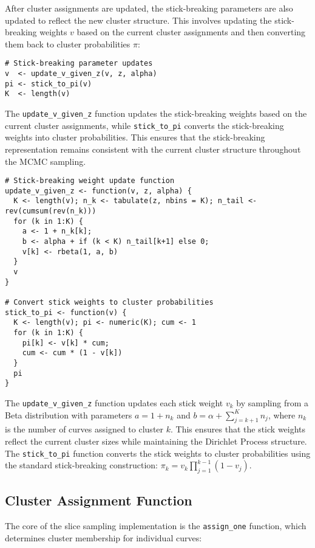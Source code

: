 \documentclass[11pt]{article}
\begin{document}
After cluster assignments are updated, the stick-breaking parameters are also updated to reflect the new cluster structure. This involves updating the stick-breaking weights $v$ based on the current cluster assignments and then converting them back to cluster probabilities $\pi$:

\begin{lstlisting}
# Stick-breaking parameter updates
v  <- update_v_given_z(v, z, alpha)
pi <- stick_to_pi(v)
K  <- length(v)
\end{lstlisting}

The \texttt{update\_v\_given\_z} function updates the stick-breaking weights based on the current cluster assignments, while \texttt{stick\_to\_pi} converts the stick-breaking weights into cluster probabilities. This ensures that the stick-breaking representation remains consistent with the current cluster structure throughout the MCMC sampling.

\begin{lstlisting}
# Stick-breaking weight update function
update_v_given_z <- function(v, z, alpha) {
  K <- length(v); n_k <- tabulate(z, nbins = K); n_tail <- rev(cumsum(rev(n_k)))
  for (k in 1:K) { 
    a <- 1 + n_k[k]; 
    b <- alpha + if (k < K) n_tail[k+1] else 0; 
    v[k] <- rbeta(1, a, b) 
  }
  v
}

# Convert stick weights to cluster probabilities
stick_to_pi <- function(v) {
  K <- length(v); pi <- numeric(K); cum <- 1
  for (k in 1:K) { 
    pi[k] <- v[k] * cum; 
    cum <- cum * (1 - v[k]) 
  }
  pi
}
\end{lstlisting}

The \texttt{update\_v\_given\_z} function updates each stick weight $v_k$ by sampling from a Beta distribution with parameters $a = 1 + n_k$ and $b = \alpha + \sum_{j=k+1}^K n_j$, where $n_k$ is the number of curves assigned to cluster $k$. This ensures that the stick weights reflect the current cluster sizes while maintaining the Dirichlet Process structure. The \texttt{stick\_to\_pi} function converts the stick weights to cluster probabilities using the standard stick-breaking construction: $\pi_k = v_k \prod_{j=1}^{k-1} (1 - v_j)$.

\subsection{Cluster Assignment Function}

The core of the slice sampling implementation is the \texttt{assign\_one} function, which determines cluster membership for individual curves:
\end{document}
